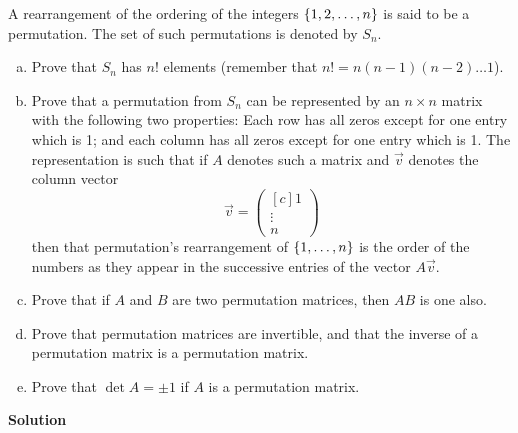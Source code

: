 \documentclass[11pt]{scrartcl}
\theoremstyle{dotlessP}
\theoremstyle{dotlessN}
\DeclarePairedDelimiter\set{\{}{\}}
\begin{document}
\begin{ques}
	[Permutation]	A rearrangement of the ordering of the integers $\set*{1,2,\dots,n}$ is said to be a permutation. The set of such permutations is denoted by  $S_n$.
	\begin{enumerate}[(a)]
		\item Prove that $S_n$ has $n!$ elements (remember that $n! = n(n-1)(n-2)\dots 1$).
		\item Prove that a permutation from $S_n$ can be represented by an $n \times n$ matrix with the following two properties: Each row has all zeros except for one entry which is 1; and each column has all zeros except for one entry which is 1. The representation is such that if  $A$ denotes such a matrix and $\vec{v}$ denotes the column vector
			\[
				\vec{v} = 
				\begin{pmatrix}[c]
				1 \\
				\vdots \\
				n
				\end{pmatrix}
			\] 
			then that permutation's rearrangement of $\set*{1,\dots, n}$ is the order of the numbers as they appear in the successive entries of the vector $A\vec{v}$.
		\item Prove that if $A $ and $B$ are two permutation matrices, then $AB$ is one also.
		\item Prove that permutation matrices are invertible, and that the inverse of a permutation matrix is a permutation matrix.
		\item Prove that $\det A = \pm 1$ if $A$ is a permutation matrix.
	\end{enumerate}
\end{ques}
\textbf{Solution}
\end{document}
